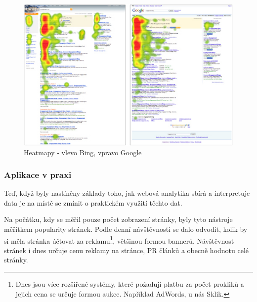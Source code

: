 \documentclass[bc,male,java,dept456]{diploma}						%
\begin{document}
\begin{figure}[hp]
	\centering
	\includegraphics[width=14cm]{img/google-bing-heatmap.pdf}
	\caption{Heatmapy - vlevo Bing, vpravo Google}
	\label{img:heatmap-bing-google}
\end{figure}






\subsubsection{Aplikace v praxi}

Teď, když byly nastíněny základy toho, jak webová analytika sbírá a interpretuje data je na místě se zmínit o praktickém využití těchto dat.


Na počátku, kdy se měřil pouze počet zobrazení stránky, byly tyto nástroje měřítkem popularity stránek. Podle denní návštěvnosti se dalo odvodit, kolik by si měla stránka účtovat za reklamu\footnote{Dnes jsou více rozšířené systémy, které požadují platbu za počet prokliků a jejich cena se určuje formou aukce. Například AdWords, u nás Sklik.}, většinou formou bannerů. Návštěvnost stránek i dnes určuje cenu reklamy na stránce, PR\cite{pr} článků a obecně hodnotu celé stránky.
\end{document}
